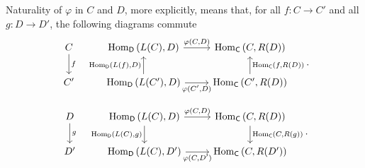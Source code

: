 \begin{rem}
	Naturality of $\varphi$ in $C$ and $D$, more explicitly,
	means that, for all $f\colon C \to C'$ and all $g\colon D \to D'$,
	the following diagrams commute
	\begin{equation}
	\begin{tikzcd}
		C \arrow[d, "f", rightarrow] &
		\mathrm{Hom}_{\mathsf{D}} \left( L(C), D \right) \arrow[r, "{\varphi(C,D)}", rightarrow] &
		\mathrm{Hom}_{\mathsf{C}} \left( C, R(D) \right)\\
		C' &
		\mathrm{Hom}_{\mathsf{D}} \left( L(C'), D \right) \arrow[r, "{\varphi(C',D)}"', rightarrow] 
		\arrow[u, "{\mathrm{Hom}_{\mathsf{D}} \left( L(f), D \right)}", rightarrow] &
		\mathrm{Hom}_{\mathsf{C}} \left( C', R(D) \right) 
		\arrow[u, "{\mathrm{Hom}_{\mathsf{C}} \left( f, R(D) \right)}"', rightarrow]
	\end{tikzcd}
	.\end{equation} 
	
	\begin{equation}
	\begin{tikzcd}
		D \arrow[d, "g", rightarrow] &
		\mathrm{Hom}_{\mathsf{D}} \left( L(C), D \right) \arrow[r, "{\varphi(C,D)}", rightarrow]
		\arrow[d, "{\mathrm{Hom}_{\mathsf{D}} \left( L(C), g \right)}"', rightarrow] &
		\mathrm{Hom}_{\mathsf{C}} \left( C, R(D) \right)
		\arrow[d, "{\mathrm{Hom}_{\mathsf{C}} \left( C, R(g) \right)}", rightarrow]\\
		D' &
		\mathrm{Hom}_{\mathsf{D}} \left( L(C), D' \right) \arrow[r, "{\varphi(C,D')}"', rightarrow] &
		\mathrm{Hom}_{\mathsf{C}} \left( C, R(D') \right) 
	\end{tikzcd}
	.\end{equation} 
\end{rem}

